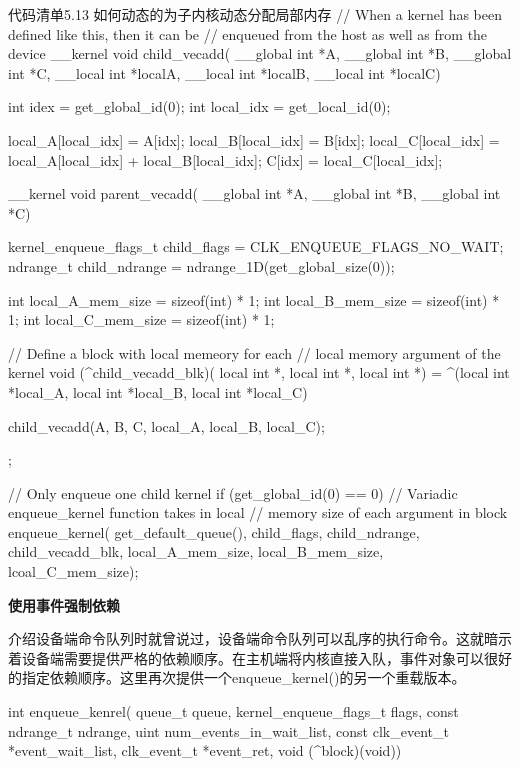 \begin{codeboxt}[cpp]{代码清单5.13 如何动态的为子内核动态分配局部内存}
// When a kernel has been defined like this, then it can be
// enqueued from the host as well as from the device
__kernel
void child_vecadd(
  __global int *A,
  __global int *B,
  __global int *C,
  __local int *localA,
  __local int *localB,
  __local int *localC){

  int idex = get_global_id(0);
  int local_idx = get_local_id(0);

  local_A[local_idx] = A[idx];
  local_B[local_idx] = B[idx];
  local_C[local_idx] = local_A[local_idx] + local_B[local_idx];
  C[idx] = local_C[local_idx];
}

__kernel
void parent_vecadd(
  __global int *A,
  __global int *B,
  __global int *C){

  kernel_enqueue_flags_t child_flags = CLK_ENQUEUE_FLAGS_NO_WAIT;
  ndrange_t child_ndrange = ndrange_1D(get_global_size(0));

  int local_A_mem_size = sizeof(int) * 1;
  int local_B_mem_size = sizeof(int) * 1;
  int local_C_mem_size = sizeof(int) * 1;

  // Define a block with local memeory for each
  // local memory argument of the kernel
  void (^child_vecadd_blk)(
    local int *,
    local int *,
    local int *) =
    ^(local int *local_A,
      local int *local_B,
      local int *local_C){

      child_vecadd(A, B, C, local_A, local_B, local_C);
    };

  // Only enqueue one child kernel
  if (get_global_id(0) == 0){
    // Variadic enqueue_kernel function takes in local
    // memory size of each argument in block
    enqueue_kernel(
      get_default_queue(),
      child_flags,
      child_ndrange,
      child_vecadd_blk,
      local_A_mem_size,
      local_B_mem_size,
      lcoal_C_mem_size);
  }
}
\end{codeboxt}

\textbf{使用事件强制依赖}

介绍设备端命令队列时就曾说过，设备端命令队列可以乱序的执行命令。这就暗示着设备端需要提供严格的依赖顺序。在主机端将内核直接入队，事件对象可以很好的指定依赖顺序。这里再次提供一个enqueue\_\allowbreak{}kernel()的另一个重载版本。

\begin{codebox}[cpp]
int
enqueue_kenrel(
  queue_t queue,
  kernel_enqueue_flags_t flags,
  const ndrange_t ndrange,
  uint num_events_in_wait_list,
  const clk_event_t *event_wait_list,
  clk_event_t *event_ret,
  void (^block)(void))
\end{codebox}

